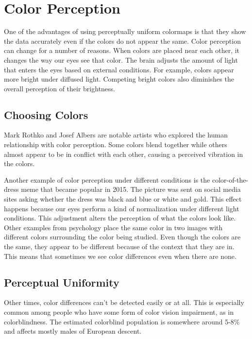 \documentclass[journal]{IEEEtran}
\begin{document}
\section{Color Perception}

One of the advantages of using perceptually uniform colormaps is
that they show the data accurately even if the colors do not appear
the same. Color perception can change for a number of reasons. When 
colors are placed near each other, it changes the way our eyes see that color.
The brain adjusts the amount of light that enters the eyes based
on external conditions. For example, colors appear more bright under diffused
light. Competing bright colors also diminishes the overall perception
of their brightness.

\subsection{Choosing Colors}

Mark Rothko and Josef Albers are notable artists who explored the human relationship
with color perception. Some colors blend together while others almost appear to be in
conflict with each other, causing a perceived vibration in the colors.

Another example of color perception under different conditions is the 
color-of-the-dress meme that became popular in 2015. The picture was
sent on social media sites asking whether the dress was black and blue
or white and gold. This effect happens because our eyes perform a kind 
of normalization under different light conditions. This adjustment alters
the perception of what the colors look like. Other examples from psychology 
place the same color in two images with different colors surrounding the
color being studied. Even though the colors are the same, they appear to be 
different because of the context that they are in. This means that sometimes
we see color differences even when there are none.

\subsection{Perceptual Uniformity}

Other times, color differences can't be detected easily or at all. This is 
especially common among people who have some form of color vision impairment,
as in colorblindness. The estimated colorblind population is somewhere around 5-8\%
and affects mostly males of European descent.
\end{document}
